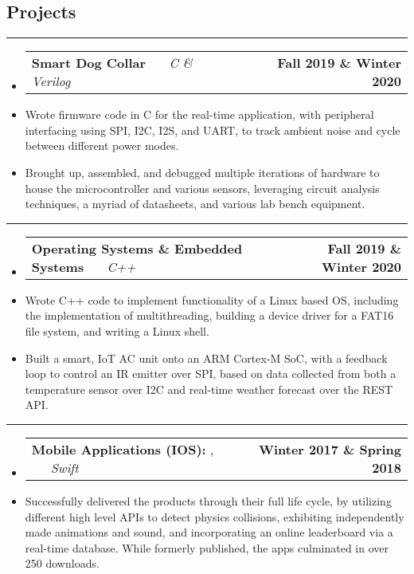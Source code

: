 \documentclass[10pt,letterpaper]{article}
\makeatletter
\newcommand{\header}[2]
{
	\begin{tabular*}{\linewidth}{l @{\extracolsep{\fill}} r}
		\hspace{-27pt} #1 & #2 \\
	\end{tabular*}
}
\newcommand{\sectionbreak}
{
	\vspace{-1.2em}
	\rule{\textwidth}{1.7pt}
	\vspace{-1.7em}
}
\makeatother
\begin{document}
\vspace{-1.5em}

\subsection*{Projects}
\sectionbreak


\begin{itemize}
	\item[]
		\header
		{
			\textbf{Smart Dog Collar}
			\emph{\smash{Senior Design Project}} \ \ \ \footnotesize \emph{C \& Verilog}
		}
		{\textbf{Fall 2019 \& Winter 2020}}
	\item 
		Wrote firmware code in C for the real-time application, with peripheral interfacing using SPI, I2C, I2S, and UART, to track ambient noise and cycle between different power modes.
	\item 
		Brought up, assembled, and debugged multiple iterations of hardware to house the microcontroller and various sensors, leveraging circuit analysis techniques, a myriad of datasheets, and various lab bench equipment.

\end{itemize}

\hrule

\begin{itemize}
	\item[]
		\header
		{
			\textbf{Operating Systems \& Embedded Systems}
			\emph{\smash{Relevant Course Project}} \ \ \ \footnotesize \emph{C++}
		}
		{\textbf{Fall 2019 \& Winter 2020}}
	\item 
		Wrote C++ code to implement functionality of a Linux based OS, including the implementation of multithreading, building a device driver for a FAT16 file system, and writing a Linux shell.
	\item 
		Built a smart, IoT AC unit onto an ARM Cortex-M SoC, with a feedback loop to control an IR emitter over SPI, based on data collected from both a temperature sensor over I2C and real-time weather forecast over the REST API. 

\end{itemize}

\hrule

\begin{itemize}
	\item[]
		\header
		{
			\textbf{Mobile Applications (IOS): }
			\href{https://appadvice.com/app/round-bound/1369632746}{\emph{\underline{\smash{Round 'a Bound}}}}, 
			\href{https://appadvice.com/app/tic-tac-emoji/1346934986}{\emph{\underline{\smash{Tic-Tac Emoji}}}} \ \ \ \footnotesize  \emph{Swift}
		}
		{\textbf{Winter 2017 \& Spring 2018}}
	\item 
		Successfully delivered the products through their full life cycle, by utilizing different high level APIs to detect physics collisions, exhibiting independently made animations and sound, and incorporating an online leaderboard via a real-time database. While formerly published, the apps culminated in over 250 downloads.
\end{itemize}
\end{document}
